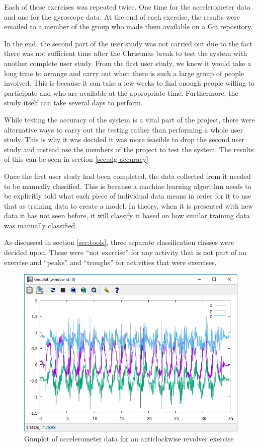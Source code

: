 Each of these exercises was repeated twice. One time for the accelerometer data and one for the gyroscope data. At the end of each exercise, the results were emailed to a member of the group who made them available on a Git repository.

In the end, the second part of the user study was not carried out due to the fact there was not sufficient time after the Christmas break to test the system with another complete user study. From the first user study, we knew it would take a long time to arrange and carry out when there is such a large group of people involved. This is because it can take a few weeks to find enough people willing to participate and who are available at the appropriate time. Furthermore, the study itself can take several days to perform. 

While testing the accuracy of the system is a vital part of the project, there were alternative ways to carry out the testing rather than performing a whole user study. This is why it was decided it was more feasible to drop the second user study and instead use the members of the project to test the system. The results of this can be seen in section \ref{sec:alg-accuracy}

Once the first user study had been completed, the data collected from it needed to be manually classified. This is because a machine learning algorithm needs to be explicitly told what each piece of individual data means in order for it to use that as training data to create a model. In theory, when it is presented with new data it has not seen before, it will classify it based on how similar training data was manually classified.

As discussed in section \ref{sec:tools}, three separate classification classes were decided upon. These were “not exercise” for any activity that is not part of an exercise and “peaks” and “troughs” for activities that were exercises. 

\begin{figure}
	\centering
	\includegraphics[width=1.0\textwidth]{figures/classification_data_plot.png}
	\caption{Gnuplot of accelerometer data for an anticlockwise revolver exercise\label{fig:gnuplot-rev}}
\end{figure}

